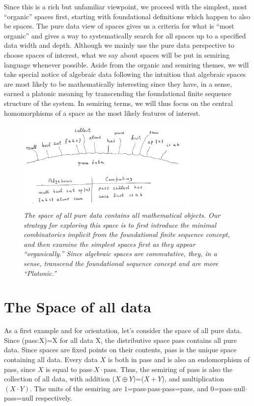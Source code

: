 \documentclass[11pt]{article}
\begin{document}
Since this is a rich but unfamiliar 
viewpoint, we proceed with the simplest, most ``organic'' spaces first, starting with foundational definitions which happen to also 
be spaces.  The pure data view of spaces gives us a criteria for what is ``most organic'' and gives a way to systematically 
search for all spaces up to a specified data width and depth.  Although we mainly use the pure data perspective to 
choose spaces of interest, what we say about spaces will be put in semiring language whenever possible.  Aside from 
the organic and semiring themes, we will take special notice of algebraic data following the intuition that algebraic 
spaces are most likely to be mathematically interesting since they have, in a sense, earned a platonic meaning by 
transcending the foundational finite sequence structure of the system.  In semiring terms, we will thus focus on
the central homomorphisms of a space as the most likely features of interest. 

\begin{figure}[h]
\centering
\includegraphics[width=0.8\textwidth]{garden1.png}
\caption{{\it The space of all pure data contains all mathematical objects.  Our strategy for exploring this space is to first introduce 
the minimal combinatorics implicit from the foundational finite sequence concept, and then examine the simplest spaces first as they 
appear ``organically.''  Since algebraic spaces are commutative, they, in a sense, transcend the foundational sequence concept and are more ``Platonic.''}}
\end{figure}

\section{The Space of all data} 

     As a first example and for orientation, let's consider the space of all pure data.  Since (pass:X)=X for all data X, the distributive space pass 
contains all pure data.  Since spaces are fixed points on their contents, pass is the unique space containing all data.  Every data $X$ is both in pass
and is also an endomorphism of pass, since $X$ is equal to pass$\cdot X\cdot$pass.  Thus, the semiring of pass is also the collection of all data, with 
addition ($X\oplus Y$)=($X+Y$), and multiplication $(X\cdot Y)$.  The units of the semiring are $1$=pass$\cdot$pass$\cdot$pass=pass, 
and $0$=pass$\cdot$null$\cdot$pass=null respectively.   
\end{document}
